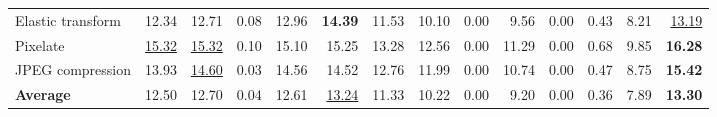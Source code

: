 \begin{table}[t]
{\begin{tabular}{lrrrrrrrrrrrrr}
Elastic transform & 12.34 & 12.71 & 0.08 & 12.96 & \textbf{14.39} & 11.53 & 10.10 & 0.00 & 9.56 & 0.00 & 0.43 & 8.21 & \underline{13.19} \\
Pixelate & \underline{15.32} & \underline{15.32} & 0.10 & 15.10 & 15.25 & 13.28 & 12.56 & 0.00 & 11.29 & 0.00 & 0.68 & 9.85 & \textbf{16.28} \\
JPEG compression & 13.93 & \underline{14.60} & 0.03 & 14.56 & 14.52 & 12.76 & 11.99 & 0.00 & 10.74 & 0.00 & 0.47 & 8.75 & \textbf{15.42} \\
\midrule
\textbf{Average} & 12.50 & 12.70 & 0.04 & 12.61 & \underline{13.24} & 11.33 & 10.22 & 0.00 & 9.20 & 0.00 & 0.36 & 7.89 & \textbf{13.30} \\
\bottomrule
\end{tabular}%
}
\end{table}

